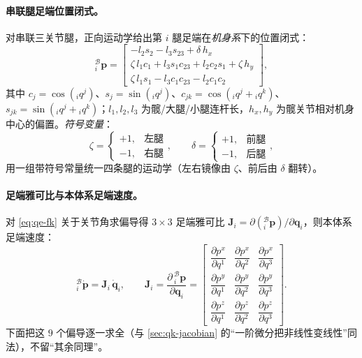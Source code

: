 \paragraph{串联腿足端位置闭式。}
对串联三关节腿，正向运动学给出第 $i$ 腿足端在\emph{机身系}下的位置闭式\cite{yu2021quadruped}：
\begin{equation}
  {}^{\mathcal{B}}_{i}\boldsymbol p =
  \begin{bmatrix}
    -l_2 s_2 - l_3 s_{23} + \delta\,h_x \\[2pt]
    \zeta\,l_1 c_1 + l_3 s_1 c_{23} + l_2 c_2 s_1 + \zeta\,h_y \\[2pt]
    \zeta\,l_1 s_1 - l_3 c_1 c_{23} - l_2 c_1 c_2
  \end{bmatrix},
  \label{eq:qe-fk}
\end{equation}
其中 $c_j=\cos({}_iq^j)$、$s_j=\sin({}_iq^j)$、$c_{jk}=\cos({}_iq^j+{}_iq^k)$、$s_{jk}=\sin({}_iq^j+{}_iq^k)$；$l_1,l_2,l_3$ 为髋/大腿/小腿连杆长，$h_x,h_y$ 为髋关节相对机身中心的偏置。\emph{符号变量}\cite{yu2021quadruped}：
\begin{equation}
  \zeta = \begin{cases}+1,&\text{左腿}\\-1,&\text{右腿}\end{cases},
  \qquad
  \delta = \begin{cases}+1,&\text{前腿}\\-1,&\text{后腿}\end{cases},
  \label{eq:qe-fk-sign}
\end{equation}
用一组带符号常量统一四条腿的运动学（左右镜像由 $\zeta$、前后由 $\delta$ 翻转）。

\paragraph{足端雅可比与本体系足端速度。}
对 \cref{eq:qe-fk} 关于关节角求偏导得 $3\times3$ 足端雅可比 $\mathbf{J}_i=\partial({}^{\mathcal{B}}_{i}\boldsymbol p)/\partial\boldsymbol q_i$，则本体系足端速度\cite{yu2021quadruped}：
\begin{equation}
  {}^{\mathcal{B}}_{i}\dot{\boldsymbol p} = \mathbf{J}_i\,\dot{\boldsymbol q}_i,
  \qquad
  \mathbf{J}_i=\frac{\partial\,{}^{\mathcal{B}}_{i}\boldsymbol p}{\partial\boldsymbol q_i}
  =\begin{bmatrix}
    \dfrac{\partial p^x}{\partial q^1}&\dfrac{\partial p^x}{\partial q^2}&\dfrac{\partial p^x}{\partial q^3}\\[6pt]
    \dfrac{\partial p^y}{\partial q^1}&\dfrac{\partial p^y}{\partial q^2}&\dfrac{\partial p^y}{\partial q^3}\\[6pt]
    \dfrac{\partial p^z}{\partial q^1}&\dfrac{\partial p^z}{\partial q^2}&\dfrac{\partial p^z}{\partial q^3}
  \end{bmatrix}.
  \label{eq:qe-foot-vel-body}
\end{equation}
下面把这 $9$ 个偏导逐一求全（与 \cref{sec:qk-jacobian} 的“一阶微分把非线性变线性”同法），不留“其余同理”。

